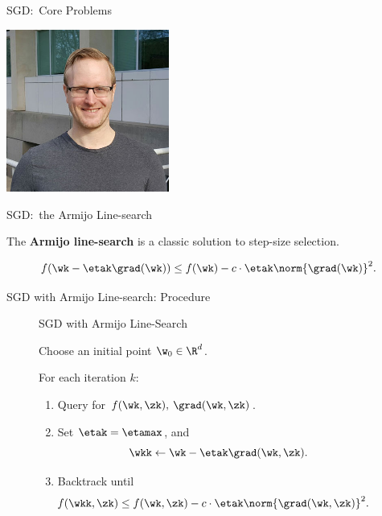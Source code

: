 \documentclass[mathserif,notheorems, hyperref={colorlinks, citecolor=blue, urlcolor=blue, linkcolor=blue}]{beamer}
\begin{document}
\begin{frame}{SGD:\ Core Problems}
\begin{textblock}{2.5}
            \vspace{0.5ex}

            \includegraphics[width=0.4\textwidth]{collaborators/mark}
        \end{textblock}

    \end{frame}
       
\begin{frame}{SGD:\ the Armijo Line-search}
       
        The \textbf{Armijo line-search} is a classic solution to step-size selection.

        \[ f(\wk - \etak \grad(\wk)) \leq f(\wk) - c\cdot \etak \norm{\grad(\wk)}^2. \]
        \vspace{1.2ex}

        \begin{figure}[]
            \centering
            
        \end{figure} 
    \end{frame}


    \begin{frame}{SGD with Armijo Line-search: Procedure}
        
        \begin{figure}[t]
            \begin{procedure}{SGD with Armijo Line-Search}
            \item Choose an initial point \( \w_0 \in \R^d \).
                \vspace{2ex}
            \item For each iteration \( k \):
                \begin{enumerate}
                    \item Query \oracle{} for \( f(\wk, \zk), \: \grad(\wk, \zk) \). 
                        \vspace{1ex}
                    \item Set \( \etak =  \etamax \), and \[ \wkk \gets \wk - \etak \grad(\wk, \zk). \]
                    \item Backtrack until
                        \[  \hspace{-1em} f(\wkk, \zk) \leq f(\wk, \zk) - c \cdot \etak \norm{\grad(\wk, \zk)}^2. \]
                \end{enumerate}
            \end{procedure}
        \end{figure}

    \end{frame}
\end{document}
